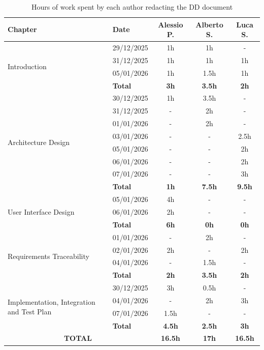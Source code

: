 \begin{table}[H]
\centering
\begin{tabular}{|p{4.5cm}|l|c|c|c|}
\hline
\textbf{Chapter} & \textbf{Date} & \textbf{Alessio P.} & \textbf{Alberto S.} & \textbf{Luca S.} \\ 
\hline

\multirow{4}{=}{Introduction} 
& 29/12/2025 & 1h & 1h & - \\  
& 31/12/2025 & 1h & 1h & 1h \\
& 05/01/2026 & 1h & 1.5h & 1h \\
\cline{2-5}
& \textbf{Total} & \textbf{3h} & \textbf{3.5h} & \textbf{2h} \\ 
\hline

\multirow{8}{=}{Architecture Design} 
& 30/12/2025 & 1h & 3.5h & - \\ 
& 31/12/2025 & - & 2h & - \\ 
& 01/01/2026 & - & 2h & - \\ 
& 03/01/2026 & - & - & 2.5h \\
& 05/01/2026 & - & - & 2h \\
& 06/01/2026 & - & - & 2h \\
& 07/01/2026 & - & - & 3h \\ 
\cline{2-5}
& \textbf{Total} & \textbf{1h} & \textbf{7.5h} & \textbf{9.5h} \\ 
\hline

\multirow{3}{=}{User Interface Design} 
& 05/01/2026 & 4h & - & - \\  
& 06/01/2026 & 2h & - & - \\
\cline{2-5}
& \textbf{Total} & \textbf{6h} & \textbf{0h} & \textbf{0h} \\ 
\hline

\multirow{4}{=}{Requirements Traceability} 
& 01/01/2026 & - & 2h & - \\ 
& 02/01/2026 & 2h & - & 2h \\ 
& 04/01/2026 & - & 1.5h & - \\ 
\cline{2-5}
& \textbf{Total} & \textbf{2h} & \textbf{3.5h} & \textbf{2h} \\ 
\hline

\multirow{4}{=}{Implementation, Integration and Test Plan} 
& 30/12/2025 & 3h & 0.5h & - \\  
& 04/01/2026 & - & 2h & 3h \\ 
& 07/01/2026 & 1.5h & - & - \\ 
\cline{2-5}
& \textbf{Total} & \textbf{4.5h} & \textbf{2.5h} & \textbf{3h} \\ 
\hline

\multicolumn{2}{|c|}{\textbf{TOTAL}} & \textbf{16.5h} & \textbf{17h} & \textbf{16.5h} \\
\hline

\end{tabular}
\caption{Hours of work spent by each author redacting the DD document}
\label{tab:effort}
\end{table}